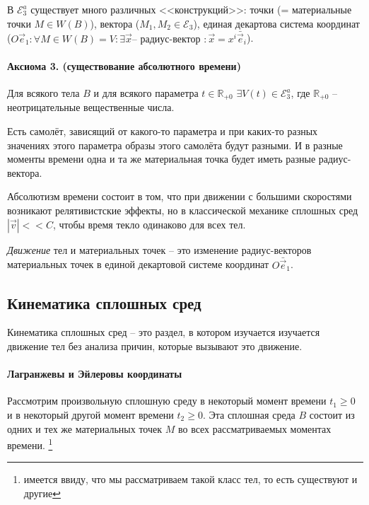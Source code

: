В $\mathcal{E}_3^a$ существует много различных <<конструкций>>: точки (= материальные точки
$M \in W(B)$), вектора ($M_1, M_2 \in \mathcal{E}_3$), единая декартова система координат
($O\vec{e}_1 : \forall M \in W(B)=V : \exists \vec{x} \text{-- радиус-вектор } :
\vec{x} = x^i \bar{\vec{e}}_i$).


\paragraph{Аксиома 3. (существование абсолютного времени)} Для всякого тела $B$ и для всякого
параметра $t \in \mathbb{R}_{+0}$ $\exists V(t) \in \mathcal{E}_3^a$, где $\mathbb{R}_{+0}$ --
неотрицательные вещественные числа.


Есть самолёт, зависящий от какого-то параметра и при каких-то разных значениях этого параметра 
образы этого самолёта будут разными. И в разные моменты времени одна и та же материальная точка
будет иметь разные радиус-вектора.

Абсолютизм времени состоит в том, что при движении с большими скоростями возникают релятивистские 
эффекты, но в классической механике сплошных сред $|\vec{v}| << C$, чтобы время текло одинаково
для всех тел.

\begin{definition}
  \emph{Движение} тел и материальных точек -- это изменение радиус-векторов материальных точек в
  единой декартовой системе координат $O \bar{\vec{e}}_1$.
\end{definition}


\subsection{Кинематика сплошных сред}

\begin{definition}
  Кинематика сплошных сред -- это раздел, в котором изучается изучается движение тел без анализа
  причин, которые вызывают это движение.
\end{definition}

\paragraph{Лагранжевы и Эйлеровы координаты}

Рассмотрим произвольную сплошную среду в некоторый момент времени $t_1 \geqslant 0$ и в некоторый
другой момент времени $t_2 \geqslant 0$.
Эта сплошная среда $B$ состоит из одних и тех же материальных точек $M$ во всех рассматриваемых 
моментах времени. \footnote{имеется ввиду, что мы рассматриваем такой класс тел, то есть существуют
и другие}
  
